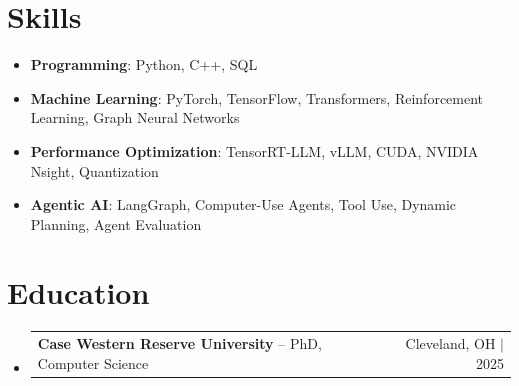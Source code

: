\documentclass[letterpaper,13pt]{article}
\makeatletter
\newcommand{\resumeProjectHeading}[2]{
    \item
    \begin{tabular*}{\textwidth}{l@{\extracolsep{\fill}}r}
      \small#1 & #2 \\
    \end{tabular*}\vspace{-4pt}
}
\newcommand{\resumeSubHeadingListStart}{\begin{itemize}[leftmargin=0in, label={}]}
\newcommand{\resumeSubHeadingListEnd}{\end{itemize}}
\makeatother
\begin{document}
\section{Skills}
\vspace{0.02cm}
\begin{itemize}[leftmargin=0.15in, label={}, itemsep=2pt, topsep=1pt]
  \item \textbf{Programming}: Python, C++, SQL
  \item \textbf{Machine Learning}: PyTorch, TensorFlow, Transformers, Reinforcement Learning, Graph Neural Networks
  \item \textbf{Performance Optimization}: TensorRT-LLM, vLLM, CUDA, NVIDIA Nsight, Quantization
  \item \textbf{Agentic AI}: LangGraph, Computer-Use Agents, Tool Use, Dynamic Planning, Agent Evaluation
\end{itemize}
\vspace{0.02cm}

\section{Education}
\resumeSubHeadingListStart
  \resumeProjectHeading{\textbf{Case Western Reserve University} -- PhD, Computer Science}{Cleveland, OH $|$ 2025}
\resumeSubHeadingListEnd
\end{document}

